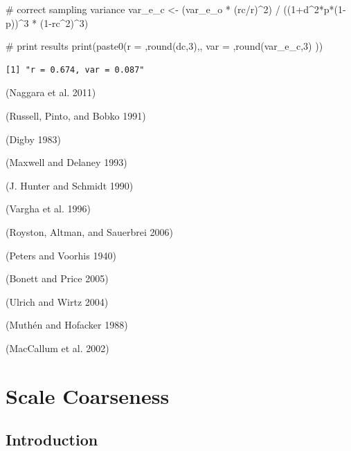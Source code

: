 \documentclass[
  letterpaper,
  DIV=11,
  numbers=noendperiod]{scrreprt}
\newenvironment{Shaded}{\begin{snugshade}}{\end{snugshade}}
\newcommand{\CommentTok}[1]{\textcolor[rgb]{0.37,0.37,0.37}{#1}}
\newcommand{\DecValTok}[1]{\textcolor[rgb]{0.68,0.00,0.00}{#1}}
\newcommand{\FunctionTok}[1]{\textcolor[rgb]{0.28,0.35,0.67}{#1}}
\newcommand{\NormalTok}[1]{\textcolor[rgb]{0.00,0.23,0.31}{#1}}
\newcommand{\OtherTok}[1]{\textcolor[rgb]{0.00,0.23,0.31}{#1}}
\newcommand{\SpecialCharTok}[1]{\textcolor[rgb]{0.37,0.37,0.37}{#1}}
\newcommand{\StringTok}[1]{\textcolor[rgb]{0.13,0.47,0.30}{#1}}
\begin{document}
\begin{Shaded}
\begin{Highlighting}[]
\CommentTok{\# correct sampling variance}
\NormalTok{var\_e\_c }\OtherTok{\textless{}{-}}\NormalTok{ (var\_e\_o }\SpecialCharTok{*}\NormalTok{ (rc}\SpecialCharTok{/}\NormalTok{r)}\SpecialCharTok{\^{}}\DecValTok{2}\NormalTok{) }\SpecialCharTok{/}\NormalTok{ ((}\DecValTok{1}\SpecialCharTok{+}\NormalTok{d}\SpecialCharTok{\^{}}\DecValTok{2}\SpecialCharTok{*}\NormalTok{p}\SpecialCharTok{*}\NormalTok{(}\DecValTok{1}\SpecialCharTok{{-}}\NormalTok{p))}\SpecialCharTok{\^{}}\DecValTok{3} \SpecialCharTok{*}\NormalTok{ (}\DecValTok{1}\SpecialCharTok{{-}}\NormalTok{rc}\SpecialCharTok{\^{}}\DecValTok{2}\NormalTok{)}\SpecialCharTok{\^{}}\DecValTok{3}\NormalTok{)}

\CommentTok{\# print results}
\FunctionTok{print}\NormalTok{(}\FunctionTok{paste0}\NormalTok{(}\StringTok{\textquotesingle{}r = \textquotesingle{}}\NormalTok{,}\FunctionTok{round}\NormalTok{(dc,}\DecValTok{3}\NormalTok{),}\StringTok{\textquotesingle{}, var = \textquotesingle{}}\NormalTok{,}\FunctionTok{round}\NormalTok{(var\_e\_c,}\DecValTok{3}\NormalTok{) ))}
\end{Highlighting}
\end{Shaded}

\begin{verbatim}
[1] "r = 0.674, var = 0.087"
\end{verbatim}

(Naggara et al. 2011)

(Russell, Pinto, and Bobko 1991)

(Digby 1983)

(Maxwell and Delaney 1993)

(J. Hunter and Schmidt 1990)

(Vargha et al. 1996)

(Royston, Altman, and Sauerbrei 2006)

(Peters and Voorhis 1940)

(Bonett and Price 2005)

(Ulrich and Wirtz 2004)

(Muthén and Hofacker 1988)

(MacCallum et al. 2002)

\hypertarget{scale-coarseness}{%
\chapter{Scale Coarseness}\label{scale-coarseness}}

\hypertarget{introduction-4}{%
\section{Introduction}\label{introduction-4}}
\end{document}

